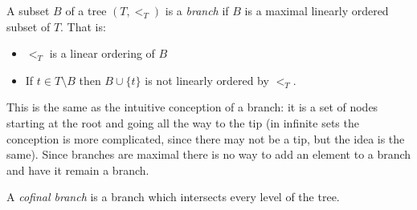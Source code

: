 \documentclass[12pt]{article}
\begin{document}
A subset $B$ of a tree $(T,<_T)$ is a \emph{branch} if $B$ is a maximal linearly ordered subset of $T$.  That is:
\begin{itemize}

\item $<_T$ is a linear ordering of $B$

\item If $t\in T\setminus B$ then $B\cup \{t\}$ is not linearly ordered by $<_T$.

\end{itemize}

This is the same as the intuitive conception of a branch: it is a set of nodes starting at the root and going all the way to the tip (in infinite sets the conception is more complicated, since there may not be a tip, but the idea is the same).  Since branches are maximal there is no way to add an element to a branch and have it remain a branch.

A \emph{cofinal branch} is a branch which intersects every level of the tree.
\end{document}
